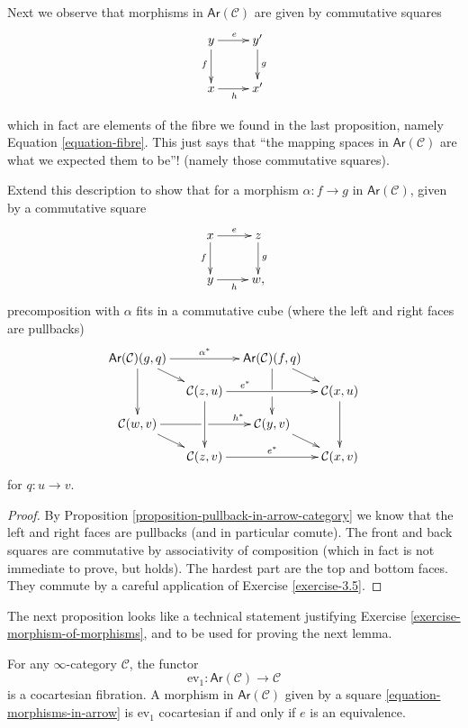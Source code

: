 \noindent
Next we observe that morphisms in $\mathsf{Ar}(\mathcal{C})$ 
are given by commutative squares
\begin{equation}
\label{equation-morphisms-in-arrow}
\xymatrix{
y\ar[r]^{e}\ar[d]_{f}&y'\ar[d]^{g}\\
x\ar[r]_{h}&x'
}
\end{equation}

\noindent
which in fact are elements of the fibre we found
in the last proposition, namely Equation \ref{equation-fibre}.
This just says that ``the mapping spaces in $\mathsf{Ar}(\mathcal{C})$ 
are what we expected them to be''!
(namely those commutative squares).

\begin{exercise}
\label{exercise-morphism-of-morphisms}
Extend this description to show that for a morphism
$\alpha:f \to g$ in $\mathsf{Ar}(\mathcal{C})$,
given by a commutative square
$$
\xymatrix{
x\ar[r]^{e}\ar[d]_{f}&z\ar[d]^{g}\\
y\ar[r]_{h}&w,
}
$$
precomposition with $\alpha$ fits in a commutative cube
(where the left and right faces are pullbacks)
$$
\xymatrixrowsep{1em}
\xymatrixcolsep{1em}
\xymatrix{
\mathsf{Ar}(\mathcal{C})(g,q) \ar[rr]^{\alpha^*} \ar[dd] \ar[rd] & & 
\mathsf{Ar}(\mathcal{C})(f,q) \ar'[d][dd] \ar[rd] \\
 & \mathcal{C}(z,u) \ar[rr]^(0.3){e^*} \ar[dd] & & \mathcal{C}(x,u) \ar[dd] \\
\mathcal{C}(w,v) \ar'[r][rr]^{h^*} \ar[rd] & & \mathcal{C}(y,v) \ar[rd] \\
 & \mathcal{C}(z,v) \ar[rr]^{e^*} & & \mathcal{C}(x,v)
}
$$
for $q:u \to v$.
\end{exercise}

\begin{proof}
By Proposition \ref{proposition-pullback-in-arrow-category}
we know that the left and right faces are pullbacks
(and in particular comute).
The front and back squares are 
commutative by associativity of composition
(which in fact is not immediate to prove, but holds).
The hardest part are the top and bottom faces.
They commute by a careful application of 
Exercise \ref{exercise-3.5}.
\end{proof}

\noindent
The next proposition looks like a technical statement
justifying Exercise \ref{exercise-morphism-of-morphisms},
and to be used for proving the next lemma.

\begin{proposition}
\label{proposition-evaluation-and-arrow}
For any $\infty$-category $\mathcal{C}$,
the functor
$$
\text{ev}_1:\mathsf{Ar}(\mathcal{C})\to\mathcal{C}
$$
is a cocartesian fibration.
A morphism in $\mathsf{Ar}(\mathcal{C})$ 
given by a square \ref{equation-morphisms-in-arrow}
is $\text{ev}_1$ cocartesian if and only if $e$ 
is an equivalence.
\end{proposition}

